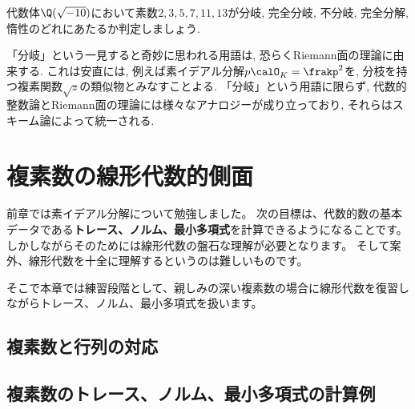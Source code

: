 \documentclass[11pt,b5paper,oneside,titlepage,lualatex]{ltjsreport}
\numberwithin{equation}{section} %
\begin{document}
\begin{exc}{}{}
	代数体$ \Q(\sqrt{-10}) $において素数$ 2, 3, 5, 7, 11, 13 $が分岐, 完全分岐, 不分岐, 完全分解, 惰性のどれにあたるか判定しましょう. 
\end{exc}

\begin{rem}{}{}
	「分岐」という一見すると奇妙に思われる用語は, 恐らくRiemann面の理論に由来する. 
	これは安直には, 例えば素イデアル分解$ p \calO_K^{} = \frakp^2 $を, 分枝を持つ複素関数$ \sqrt{z} $の類似物とみなすことよる. 
	「分岐」という用語に限らず, 代数的整数論とRiemann面の理論には様々なアナロジーが成り立っており, それらはスキーム論によって統一される. 
\end{rem}

\clearpage


\chapter{複素数の線形代数的側面} \label{chap:複素数の線形代数的側面}


前章では素イデアル分解について勉強しました。
次の目標は、代数的数の基本データである\textbf{トレース、ノルム、最小多項式}を計算できるようになることです。
しかしながらそのためには線形代数の盤石な理解が必要となります。
そして案外、線形代数を十全に理解するというのは難しいものです。

そこで本章では練習段階として、親しみの深い複素数の場合に線形代数を復習しながらトレース、ノルム、最小多項式を扱います。



\section{複素数と行列の対応} \label{sec:複素数と行列の対応}





\section{複素数のトレース、ノルム、最小多項式の計算例} \label{sec:複素数のトレース、ノルム、最小多項式の計算例}
\end{document}
